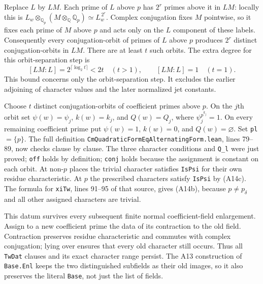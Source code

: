 \documentclass[11pt]{article}
\newcommand{\Q}{\mathbb Q}\newcommand{\C}{\mathbb C}\newcommand{\Z}{\mathbb Z}\newcommand{\R}{\mathbb R}\newcommand{\A}{\mathbb A}\newcommand{\OO}{\mathcal O}
\theoremstyle{definition}\newtheorem{definition}[theorem]{Definition}\newtheorem{remark}[theorem]{Remark}
\begin{document}
Replace $L$ by $LM$.  Each prime of $L$ above $p$ has $2^r$ primes
above it in $LM$: locally this is
$L_w\otimes_{\Q_p}(M\otimes_\Q\Q_p)
 \simeq L_w^{\,2^r}$.
Complex conjugation fixes $M$ pointwise, so it fixes each prime of
$M$ above $p$ and acts only on the $L$ component of these labels.
Consequently every conjugation-orbit of primes of $L$ above $p$
produces $2^r$ distinct conjugation-orbits in $LM$.  There are at
least $t$ such orbits.  The extra degree for this orbit-separation
step is
\[
 [LM:L]=2^{\lceil\log_2 t\rceil}<2t
 \quad(t>1),
 \qquad [LM:L]=1\quad(t=1).
 \tag{A14e}
\]
This bound concerns only the orbit-separation step.  It excludes
the earlier adjoining of character values and the later normalized
jet constants.

Choose $t$ distinct conjugation-orbits of coefficient primes above
$p$.  On the $j$th orbit set
$\psi(w)=\psi_j$, $k(w)=k_j$, and $Q(w)=Q_j$, where
$\psi_j^{p^{k_j}}=1$.  On every remaining coefficient prime put
$\psi(w)=1$, $k(w)=0$, and $Q(w)=\varnothing$.
Set \texttt{pl}$=\{p\}$.  The full definition
\nolinkurl{CmQuadraticFormEqAlternatingForm.lean}, lines 79--89,
now checks clause by clause.  The three character conditions and
\texttt{Q\_l} were just proved; \texttt{off} holds by definition;
\texttt{conj} holds because the assignment is constant on each orbit.
At non-$p$ places the trivial character satisfies \texttt{IsPsi} for
their own residue characteristic.  At $p$ the prescribed characters
satisfy \texttt{IsPsi} by (A14c).  The formula for
\texttt{xiTw}, lines 91--95 of that source, gives (A14b), because
$p\ne p_\delta$ and all other assigned characters are trivial.

This datum survives every subsequent finite normal coefficient-field
enlargement.  Assign to a new coefficient prime the data of its
contraction to the old field.  Contraction preserves residue
characteristic and commutes with complex conjugation; lying over
ensures that every old character still occurs.  Thus all
\texttt{TwDat} clauses and its exact character range persist.
The A13 construction of \texttt{Base.Enl} keeps the two distinguished
subfields as their old images, so it also preserves the literal
\texttt{Base}, not just the list of fields.
\end{document}
